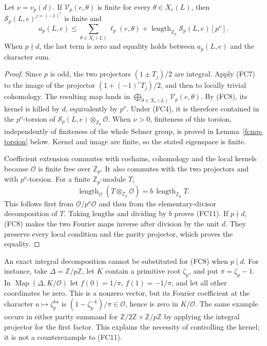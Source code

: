 \begin{proposition}\label{fcmp-fourier}
Let $\nu=v_p(d)$.
If $\mathcal V_p(e,\theta)$ is finite for every
$\theta\in X_e(L)$, then $\mathcal S_p(L,e)^{j=(-1)^e}$
is finite and
\[
 a_p(L,e)\le\sum_{\theta\in X_e(L)}\ell_p(e,\theta)
             +\operatorname{length}_{\mathbb Z_p}
                             \mathcal S_p(L,e)[p^\nu].
                                                               \tag{FC11}
\]
When $p\nmid d$, the last term is zero and equality holds
between $a_p(L,e)$ and the character sum.
\end{proposition}
\begin{proof}
Since $p$ is odd, the two projectors $(1\pm T_j)/2$
are integral. Apply (FC7) to the image of the projector
$(1+(-1)^eT_j)/2$, and then to locally trivial cohomology.
The resulting map lands in
$\bigoplus_{\theta\in X_e(L)}\mathcal V_p(e,\theta)$.
By (FC8), its kernel is killed by $d$, equivalently by
$p^\nu$. Under (FC4), it is therefore contained in the
$p^\nu$-torsion of $\mathcal S_p(L,e)\otimes_{\mathbb Z_p}\mathcal O$.
When $\nu>0$, finiteness of this torsion, independently
of finiteness of the whole Selmer group, is proved in
Lemma~\ref{fcmp-torsion} below. Kernel and image are finite,
so the stated eigenspace is finite.

Coefficient extension commutes with cochains, cohomology
and the local kernels because $\mathcal O$ is finite free
over $\mathbb Z_p$. It also commutes with the two projectors
and with $p^\nu$-torsion. For a finite $\mathbb Z_p$-module
$T$,
\[
 \operatorname{length}_{\mathcal O}
                  (T\otimes_{\mathbb Z_p}\mathcal O)
                =b\,\operatorname{length}_{\mathbb Z_p}T.
                                                               \tag{FC12}
\]
This follows first from $\mathcal O/p^a\mathcal O$ and
then from the elementary-divisor decomposition of $T$.
Taking lengths and dividing by $b$ proves (FC11).
If $p\nmid d$, (FC8) makes the two Fourier maps inverse
after division by the unit $d$. They preserve every
local condition and the parity projector, which proves
the equality.
\end{proof}

\begin{remark}\label{fcmp-integral-error}
An exact integral decomposition cannot be substituted for
(FC8) when $p\mid d$. For instance, take $\Delta=\mathbb Z/p\mathbb Z$,
let $K$ contain a primitive root $\zeta_p$, and put
$\pi=\zeta_p-1$. In $\operatorname{Map}(\Delta,K/\mathcal O)$
let $f(0)=1/\pi$, $f(1)=-1/\pi$, and let all other
coordinates be zero. This is a nonzero vector, but its
Fourier coefficient at the character $a\mapsto\zeta_p^{ka}$
is $(1-\zeta_p^{-k})/\pi\in\mathcal O$, hence is zero in
$K/\mathcal O$. The same example occurs in either parity
summand for $\mathbb Z/2\mathbb Z\times\mathbb Z/p\mathbb Z$
by applying the integral projector for the first factor.
This explains the necessity of controlling the kernel;
it is not a counterexample to (FC11).
\end{remark}


